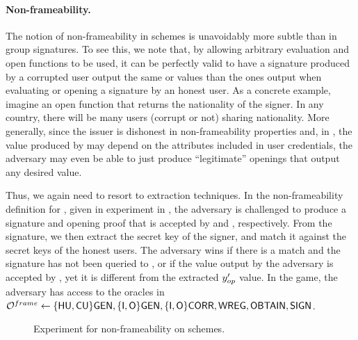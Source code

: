 \paragraph{Non-frameability.} %
The notion of non-frameability in \UAS schemes is unavoidably more subtle than
in group signatures. To see this, we note that, by allowing arbitrary
evaluation and open functions to be used, it can be perfectly valid to
have a signature produced by a corrupted user output the same \yeval or \yinsp
values than the ones output when evaluating or opening a signature by an honest
user. As a concrete example, imagine an open function that returns the
nationality of the signer. In any country, there will be many users (corrupt or
not) sharing nationality.
%
More generally, since the issuer is dishonest in non-frameability properties
and, in \UAS, the value produced by \Open may depend on the attributes
included in user credentials, the adversary may even be able to just produce
``legitimate'' openings that output any desired value.

Thus, we again need to resort to extraction techniques. In the non-frameability
definition for \UAS, given in experiment \ExpNonframe in
, the adversary is challenged to produce a signature
and opening proof that is accepted by \Verify and \Judge, respectively. From
the signature, we then extract the secret key of the signer, and match it
against the secret keys of the honest users. The adversary wins if there is a
match and the signature has not been queried to \SIGN, or if the value \yinsp
output by the adversary is accepted by \Judge, yet it is different from the
extracted $y_{op}'$ value. In the game, the
adversary has access to the oracles in $\mathcal{O}^{frame} \gets \lbrace\mathsf{HU},\mathsf{CU}\rbrace\mathsf{GEN},
\lbrace\mathsf{I},\mathsf{O}\rbrace\mathsf{GEN},\lbrace\mathsf{I},\mathsf{O}\rbrace\mathsf{CORR},\mathsf{WREG},\mathsf{OBTAIN},\mathsf{SIGN}$.

\begin{figure}[htp!]
  \caption{Experiment for non-frameability on \UAS schemes.}
  \label{fig:exp-uas-frame}
\end{figure}

